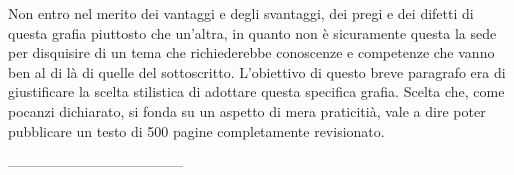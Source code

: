 Non entro nel merito dei vantaggi e degli svantaggi, dei pregi e dei difetti di questa grafia piuttosto che un'altra, in quanto non è sicuramente questa la sede per disquisire di un tema che richiederebbe conoscenze e competenze che vanno ben al di là di quelle del sottoscritto. L'obiettivo di questo breve paragrafo era di giustificare la scelta stilistica di adottare questa specifica grafia. Scelta che, come pocanzi dichiarato, si fonda su un aspetto di mera praticitià, vale a dire poter pubblicare un testo di 500 pagine completamente revisionato.  


--------------------------------------




